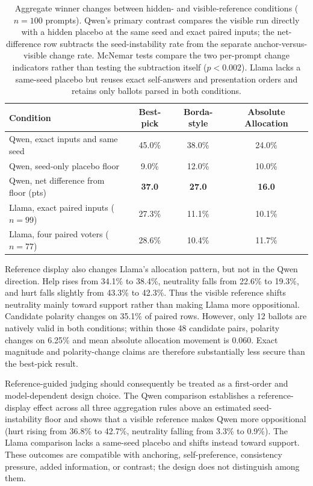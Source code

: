 \documentclass[11pt]{article}
\begin{document}
\begin{table}[h]
\centering
\begin{tabular}{lccc}
\toprule
Condition & Best-pick & Borda-style & Absolute Allocation \\
\midrule
Qwen, exact inputs and same seed & 45.0\% & 38.0\% & 24.0\% \\
Qwen, seed-only placebo floor & 9.0\% & 12.0\% & 10.0\% \\
Qwen, net difference from floor (pts) & \textbf{37.0} & \textbf{27.0} & \textbf{16.0} \\
Llama, exact paired inputs ($n=99$) & 27.3\% & 11.1\% & 10.1\% \\
Llama, four paired voters ($n=77$) & 28.6\% & 10.4\% & 11.7\% \\
\bottomrule
\end{tabular}
\caption{Aggregate winner changes between hidden- and visible-reference
conditions ($n=100$ prompts). Qwen's primary contrast compares the visible run
directly with a hidden placebo at the same seed and exact paired inputs; the
net-difference row subtracts the seed-instability rate from the separate
anchor-versus-visible change rate. McNemar tests compare the two per-prompt
change indicators rather than testing the subtraction itself ($p<0.002$).
Llama lacks a same-seed placebo but reuses exact self-answers and
presentation orders and retains only ballots parsed in both conditions.}
\label{tab:anchoringpaired}
\end{table}

Reference display also changes Llama's allocation pattern, but not in the
Qwen direction. Help rises from 34.1\% to 38.4\%, neutrality falls from 22.6\%
to 19.3\%, and hurt falls slightly from 43.3\% to 42.3\%. Thus the visible
reference shifts neutrality mainly toward support rather than making Llama
more oppositional. Candidate polarity changes on 35.1\% of paired rows.
However, only 12 ballots are natively valid in both conditions; within those
48 candidate pairs, polarity changes on 6.25\% and mean absolute allocation
movement is 0.060. Exact magnitude and polarity-change claims are therefore
substantially less secure than the best-pick result.

Reference-guided judging should consequently be treated as a first-order and
model-dependent design choice. The Qwen comparison establishes a reference-
display effect across all three aggregation rules above an estimated
seed-instability floor and shows that a visible reference makes Qwen
more oppositional (hurt rising from 36.8\% to 42.7\%, neutrality falling from
3.3\% to 0.9\%). The Llama comparison lacks a same-seed placebo and shifts
instead toward support. These outcomes are compatible with anchoring,
self-preference, consistency pressure, added information, or contrast; the
design does not distinguish among them.
\end{document}
